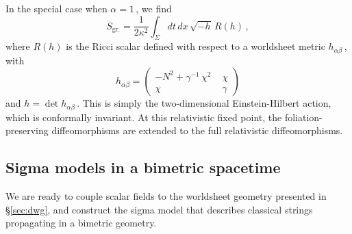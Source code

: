 \documentclass[11pt]{article}
\newcommand{\be}{\begin{equation}}
\newcommand{\ee}{\end{equation}}
\begin{document}
In the special case when $\alpha = 1$\,, we find 
%
\be
	S_\text{gr.} = \frac{1}{2 \kappa^2} \int_\Sigma dt \, dx \, \sqrt{- h} \, R(h)\,, 
\ee
%
where $R(h)$ is the Ricci scalar defined with respect to a worldsheet metric $h_{\alpha\beta}$\,, with
%
\be \label{eq:hab}
	h_{\alpha\beta} = 
	\begin{pmatrix}
		- N^2 + \gamma^{-1} \, \chi^2 & \,\, \chi \\
		\chi & \,\, \gamma
	\end{pmatrix}
\ee
%
and $h = \det h_{\alpha\beta}$\,. This is simply the two-dimensional Einstein-Hilbert action, which is conformally invariant. At this relativistic fixed point, the foliation-preserving diffeomorphisms are extended to the full relativistic diffeomorphisms. 


\subsection{Sigma models in a bimetric spacetime} \label{eq:smibs}

We are ready to couple scalar fields to the worldsheet geometry presented in \S\ref{sec:dwg}, and construct the sigma model that describes classical strings propagating in a bimetric geometry. 
\end{document}
